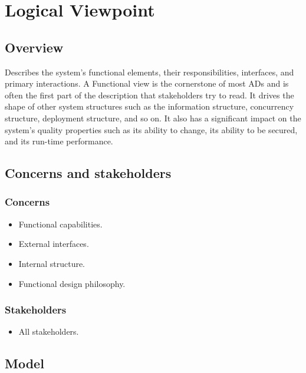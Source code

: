 
\section{Logical Viewpoint}

\subsection{Overview}

Describes the system’s functional elements, their responsibilities, interfaces, and primary interactions. A Functional view is the cornerstone of most ADs and is often the first part of the description that stakeholders try to read. It drives the shape of other system structures such as the information structure, concurrency structure, deployment structure, and so on. It also has a significant impact on the system’s quality properties such as its ability to change, its ability to be secured, and its run-time performance. 

\subsection{Concerns and stakeholders}

\subsubsection{Concerns} 

\begin{itemize}
\item Functional capabilities. 
\item External interfaces.
\item Internal structure.
\item Functional design philosophy.
\end{itemize}

\subsubsection{Stakeholders}
\begin{itemize}
\item All stakeholders.
\end{itemize}

\subsection{Model}

